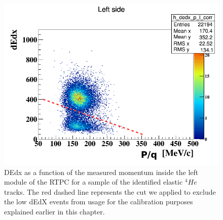 \begin{figure}[tbp]
\centering
\includegraphics[scale=0.4]{fig_rtpc/dedx_l_cal_cut.png}
\caption{DEdx as a function of the measured momentum inside the left module of 
the RTPC for a sample of the identified elastic $^{4}He$ tracks. The red dashed 
line represents the cut we applied to exclude the low dEdX events from usage 
for the calibration purposes explained earlier in this chapter.}
\label{fig:dedx_cal_left}
\end{figure}




